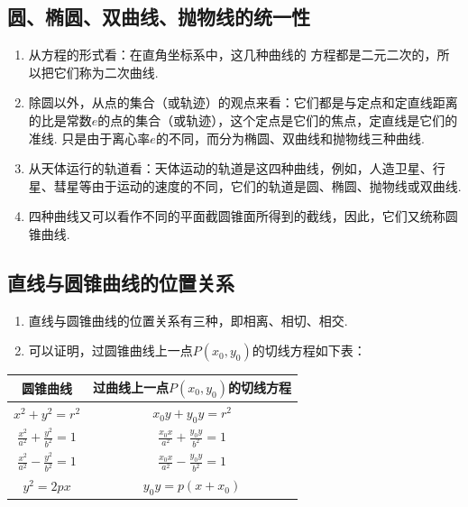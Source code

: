 \subsection{圆、椭圆、双曲线、抛物线的统一性}
\begin{enumerate}
\item 从方程的形式看：在直角坐标系中，这几种曲线的
方程都是二元二次的，所以把它们称为二次曲线.
\item 除圆以外，从点的集合（或轨迹）的观点来看：它们都是与定点和定直线距离的比是常数$e$的点的集合（或轨迹），这个定点是它们的焦点，定直线是它们的准线. 只是由于离心率$e$的不同，而分为椭圆、双曲线和抛物线三种曲线.
\item 从天体运行的轨道看：天体运动的轨道是这四种曲线，例如，人造卫星、行星、彗星等由于运动的速度的不同，它们的轨道是圆、椭圆、抛物线或双曲线.
\item 四种曲线又可以看作不同的平面截圆锥面所得到的截线，因此，它们又统称圆锥曲线.
\end{enumerate}

\subsection{直线与圆锥曲线的位置关系}
\begin{enumerate}
  \item 直线与圆锥曲线的位置关系有三种，即相离、相切、相交.
\item 可以证明，过圆锥曲线上一点$P(x_0,y_0)$的切线方程如下表：
\end{enumerate}

\begin{center}
\begin{tabular}{cc}
   \hline
    圆锥曲线&  过曲线上一点$P(x_0,y_0)$的切线方程\\
    \hline
$x^2+y^2=r^2$  & $x_0y+y_0y=r^2$\\
$\frac{x^2}{a^2}+\frac{y^2}{b^2}=1$ & $\frac{x_0 x}{a^2}+\frac{y_0 y}{b^2}=1$\\[1.5ex]
$\frac{x^2}{a^2}-\frac{y^2}{b^2}=1$ & $\frac{x_0 x}{a^2}-\frac{y_0 y}{b^2}=1$\\[1.5ex]
$y^2=2px$ &$y_0 y=p(x+x_0)$\\
\hline
\end{tabular}
\end{center}


